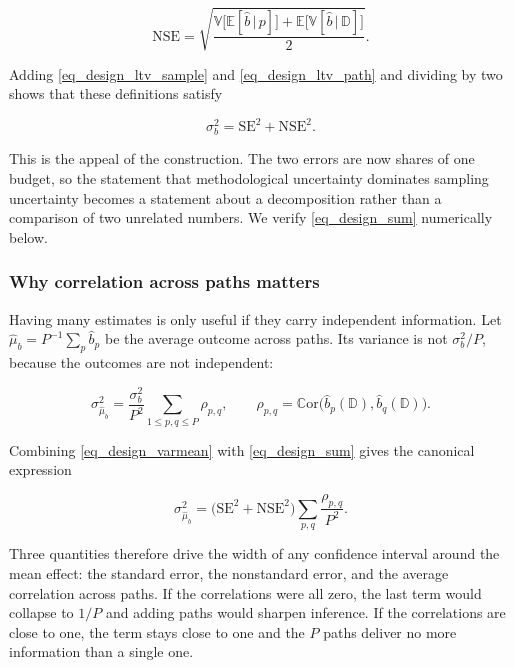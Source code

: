 \begin{equation}
\label{eq_design_nse}
\text{NSE} = \sqrt{\frac{\mathbb{V}\big[\mathbb{E}[\hat{b}\,|\,p]\big] + \mathbb{E}\big[\mathbb{V}[\hat{b}\,|\,\mathbb{D}]\big]}{2}}.
\end{equation}

Adding \ref{eq_design_ltv_sample} and \ref{eq_design_ltv_path} and dividing by two shows that these definitions satisfy

\begin{equation}
\label{eq_design_sum}
\sigma_b^2 = \text{SE}^2 + \text{NSE}^2.
\end{equation}

This is the appeal of the construction. The two errors are now shares of one budget, so the statement that methodological uncertainty dominates sampling uncertainty becomes a statement about a decomposition rather than a comparison of two unrelated numbers. We verify \ref{eq_design_sum} numerically below.

\subsubsection{Why correlation across paths matters}\label{sec_design_corr}

Having many estimates is only useful if they carry independent information. Let $\hat{\mu}_b = P^{ -1}\sum_p \hat{b}_p$ be the average outcome across paths. Its variance is not $\sigma_b^2 / P$, because the outcomes are not independent:

\begin{equation}
\label{eq_design_varmean}
\sigma^2_{\hat{\mu}_b} = \frac{\sigma_b^2}{P^2}\sum_{1 \le p,q \le P} \rho_{p,q},
\qquad \rho_{p,q} = \mathbb{C}\text{or}\big(\hat{b}_p(\mathbb{D}), \hat{b}_q(\mathbb{D})\big).
\end{equation}

Combining \ref{eq_design_varmean} with \ref{eq_design_sum} gives the canonical expression

\begin{equation}
\label{eq_design_canonical}
\sigma^2_{\hat{\mu}_b} = \big(\text{SE}^2 + \text{NSE}^2\big) \sum_{p,q} \frac{\rho_{p,q}}{P^2}.
\end{equation}

Three quantities therefore drive the width of any confidence interval around the mean effect: the standard error, the nonstandard error, and the average correlation across paths. If the correlations were all zero, the last term would collapse to $1/P$ and adding paths would sharpen inference. If the correlations are close to one, the term stays close to one and the $P$ paths deliver no more information than a single one.

